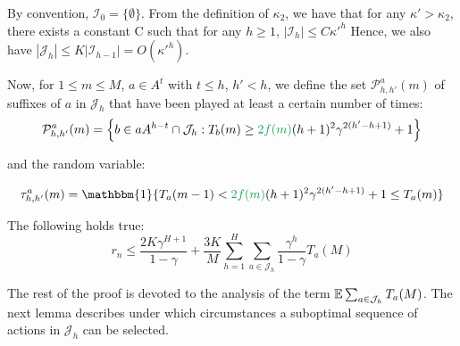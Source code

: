 \documentclass[runningheads, envcountsame, a4paper]{llncs}
\newcommand{\diff}[1]{\textcolor{ForestGreen}{#1}}
\begin{document}
By convention, $\mathcal{I}_0 = \{\emptyset\}$. From the definition of $\kappa_2$, we have that for any $\kappa'>\kappa_2$, there exists a constant C such that for any $h \geq 1$,
    $|\mathcal{I}_h| \leq C {\kappa'}^h$
Hence, we also have $|\mathcal{J}_h| \leq K|\mathcal{I}_{h-1}| = O({\kappa'}^h)$.

Now, for $1\leq m \leq M$, $a \in A^t$ with $t \leq h$, $h'<h$, we define the set $\mathcal{P}^a_{h,h'}(m)$ of suffixes of $a$ in $\mathcal{J}_h$ that have been played at least a certain number of times:
\begin{equation*}
    \mathcal{P}^a_{h,h'}(m) = \left\{ b\in a A^{h-t}\cap \mathcal{J}_h : T_b(m) \geq \diff{2f(m)}(h+1)^2\gamma^{2(h'-h+1)} + 1 \right\}
\end{equation*}

and the random variable:

\begin{equation*}
    \tau^a_{h,h'}(m) = \mathbbm{1}\{T_a(m-1) < \diff{2f(m)}(h+1)^2\gamma^{2(h'-h+1)} + 1 \leq T_a(m)\}
\end{equation*}

\begin{lemma}
\label{lemma:expected-regret}
The following holds true:
\begin{equation*}
    r_n \leq \frac{2K \gamma^{H+1}}{1-\gamma} +\frac{3K}{M}\sum_{h=1}^H\sum_{a\in\mathcal{J}_h}\frac{\gamma^h}{1-\gamma}T_a(M)
\end{equation*}
\end{lemma}


The rest of the proof is devoted to the analysis of the term $\operatorname*{\mathbb{E}} \sum_{a\in \mathcal{J}_h} T_a(M)$. The next lemma describes under which circumstances a suboptimal sequence of actions in $\mathcal{J}_h$ can be selected.
\end{document}
